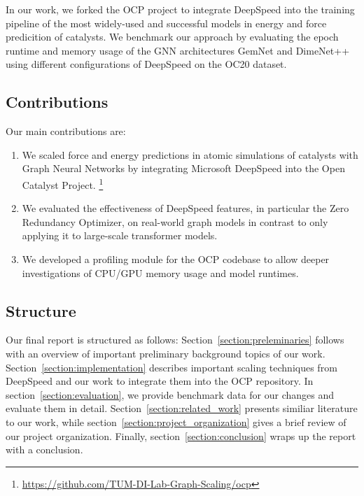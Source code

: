 In our work, we forked the OCP project to integrate DeepSpeed into the training pipeline of the most widely-used 
and successful models in energy and force predicition of catalysts. 
We benchmark our approach by evaluating the epoch runtime and memory usage of the GNN architectures GemNet and 
DimeNet++ using different configurations of DeepSpeed on the OC20 dataset.


\subsection{Contributions}

Our main contributions are:

\begin{enumerate}
    \item We scaled force and energy predictions in atomic simulations of catalysts with Graph Neural Networks 
    by integrating Microsoft DeepSpeed into the Open Catalyst Project.
    \footnote{\url{https://github.com/TUM-DI-Lab-Graph-Scaling/ocp}}
    \item We evaluated the effectiveness of DeepSpeed features, in particular the Zero Redundancy Optimizer, on 
    real-world graph models in contrast to only applying it to large-scale transformer models.
    \item We developed a profiling module for the OCP codebase to allow deeper investigations of CPU/GPU memory 
    usage and model runtimes.
\end{enumerate}

\subsection{Structure}

Our final report is structured as follows: Section~\ref{section:preleminaries} follows with an overview of 
important preliminary background topics of our work. Section~\ref{section:implementation} describes important 
scaling techniques from DeepSpeed and our work to integrate them into the OCP repository. In 
section~\ref{section:evaluation}, we provide benchmark data for our changes and evaluate them in detail. 
Section~\ref{section:related_work} presents similiar literature to our work, while section~\ref{section:project_organization} 
gives a brief review of our project organization. Finally, section~\ref{section:conclusion} wraps up the 
report with a conclusion.